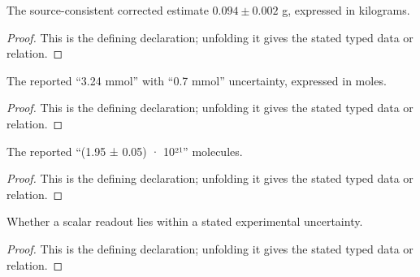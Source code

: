 \begin{definition}[officialMassEstimateKilograms]
  \label{decl:physics:IPhO_2026_4_A_1:officialMassEstimateKilograms}
  The source-consistent corrected estimate \(0.094\pm0.002\) g, expressed in kilograms.
\end{definition}
\begin{proof}
  This is the defining declaration; unfolding it gives the stated typed data or relation.
\end{proof}

\begin{definition}[officialAmountEstimateMoles]
  \label{decl:physics:IPhO_2026_4_A_1:officialAmountEstimateMoles}
  The reported “3.24 mmol” with “0.7 mmol” uncertainty, expressed in moles.
\end{definition}
\begin{proof}
  This is the defining declaration; unfolding it gives the stated typed data or relation.
\end{proof}

\begin{definition}[officialMoleculeCountEstimate]
  \label{decl:physics:IPhO_2026_4_A_1:officialMoleculeCountEstimate}
  The reported “(1.95 ± 0.05) · 10²¹” molecules.
\end{definition}
\begin{proof}
  This is the defining declaration; unfolding it gives the stated typed data or relation.
\end{proof}

\begin{definition}[WithinEstimate]
  \label{decl:physics:IPhO_2026_4_A_1:WithinEstimate}
  Whether a scalar readout lies within a stated experimental uncertainty.
\end{definition}
\begin{proof}
  This is the defining declaration; unfolding it gives the stated typed data or relation.
\end{proof}


